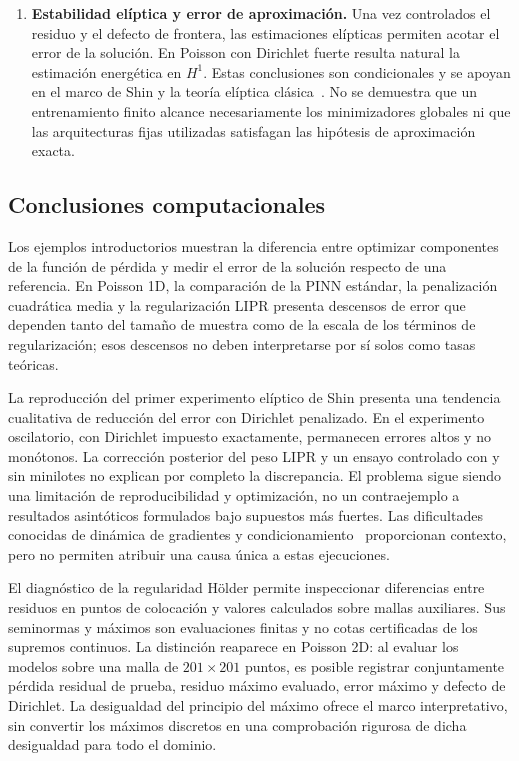 \begin{enumerate}
\item \textbf{Estabilidad elíptica y error de aproximación.} Una vez controlados el residuo y el defecto de frontera, las estimaciones elípticas permiten acotar el error de la solución. En Poisson con Dirichlet fuerte resulta natural la estimación energética en $H^1$. Estas conclusiones son condicionales y se apoyan en el marco de Shin y la teoría elíptica clásica~\cite{gilbarg2001elliptic}. No se demuestra que un entrenamiento finito alcance necesariamente los minimizadores globales ni que las arquitecturas fijas utilizadas satisfagan las hipótesis de aproximación exacta.
\end{enumerate}

\subsection{Conclusiones computacionales}

Los ejemplos introductorios muestran la diferencia entre optimizar componentes de la función de pérdida y medir el error de la solución respecto de una referencia. En Poisson 1D, la comparación de la PINN estándar, la penalización cuadrática media y la regularización LIPR presenta descensos de error que dependen tanto del tamaño de muestra como de la escala de los términos de regularización; esos descensos no deben interpretarse por sí solos como tasas teóricas.

La reproducción del primer experimento elíptico de Shin presenta una tendencia cualitativa de reducción del error con Dirichlet penalizado. En el experimento oscilatorio, con Dirichlet impuesto exactamente, permanecen errores altos y no monótonos. La corrección posterior del peso LIPR y un ensayo controlado con y sin minilotes no explican por completo la discrepancia. El problema sigue siendo una limitación de reproducibilidad y optimización, no un contraejemplo a resultados asintóticos formulados bajo supuestos más fuertes. Las dificultades conocidas de dinámica de gradientes y condicionamiento~\cite{wang2021gradient,krishnapriyan2021failure} proporcionan contexto, pero no permiten atribuir una causa única a estas ejecuciones.

El diagnóstico de la regularidad H\"older permite inspeccionar diferencias entre residuos en puntos de colocación y valores calculados sobre mallas auxiliares. Sus seminormas y máximos son evaluaciones finitas y no cotas certificadas de los supremos continuos. La distinción reaparece en Poisson 2D: al evaluar los modelos sobre una malla de $201\times201$ puntos, es posible registrar conjuntamente pérdida residual de prueba, residuo máximo evaluado, error máximo y defecto de Dirichlet. La desigualdad del principio del máximo ofrece el marco interpretativo, sin convertir los máximos discretos en una comprobación rigurosa de dicha desigualdad para todo el dominio.


